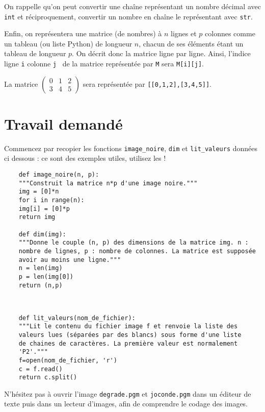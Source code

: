 \bigskip On rappelle qu'on peut convertir une chaîne représentant un nombre
décimal avec \texttt{int} et réciproquement, convertir un nombre en chaîne
le représentant avec \texttt{str}.

\bigskip Enfin, on représentera une matrice (de nombres) à $n$ lignes et $p$ colonnes comme un tableau (ou liste Python) de longueur $n$, chacun de ses éléments étant un tableau de longueur $p$. On décrit donc la matrice ligne par ligne. 
Ainsi, l'indice \og ligne \texttt{i} colonne \texttt{j} \fg\ de la matrice représentée par \texttt{M} sera \texttt{M[i][j]}.
\begin{exemple}
	La matrice $\begin{pmatrix} 0&1&2 \\ 3&4&5 \end{pmatrix}$ sera représentée par \texttt{[[0,1,2],[3,4,5]]}.
\end{exemple}

\section*{Travail demandé}

Commencez par recopier les fonctions  \texttt{image\_noire}, \texttt{dim} et  \texttt{lit\_valeurs} données ci dessous : ce sont des exemples utiles, utilisez les ! 

\begin{lstlisting}
	def image_noire(n, p):
	"""Construit la matrice n*p d'une image noire."""
	img = [0]*n
	for i in range(n):
	img[i] = [0]*p
	return img
	
	def dim(img):
	"""Donne le couple (n, p) des dimensions de la matrice img. n :
	nombre de lignes, p : nombre de colonnes. La matrice est supposée
	avoir au moins une ligne."""
	n = len(img)
	p = len(img[0])
	return (n,p)
	
\end{lstlisting}

\eject \begin{lstlisting}
	
	def lit_valeurs(nom_de_fichier):
	"""Lit le contenu du fichier image f et renvoie la liste des
	valeurs lues (séparées par des blancs) sous forme d'une liste
	de chaines de caractères. La première valeur est normalement
	'P2'."""
	f=open(nom_de_fichier, 'r')
	c = f.read()
	return c.split()
\end{lstlisting}


N'hésitez pas à ouvrir l'image \texttt{degrade.pgm} et \texttt{joconde.pgm} dans un éditeur de texte puis dans un lecteur d'images, afin de comprendre le codage des images.


